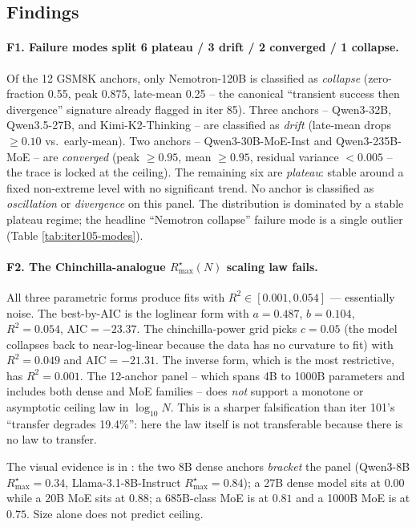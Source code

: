 \subsection*{Findings}

\paragraph{F1. Failure modes split 6 plateau / 3 drift / 2 converged / 1 collapse.}
Of the 12 GSM8K anchors, only Nemotron-120B is classified as
\emph{collapse} (zero-fraction 0.55, peak 0.875, late-mean 0.25 -- the
canonical ``transient success then divergence'' signature already
flagged in iter 85).  Three anchors -- Qwen3-32B, Qwen3.5-27B, and
Kimi-K2-Thinking -- are classified as \emph{drift} (late-mean drops
$\geq 0.10$ vs.\ early-mean).  Two anchors -- Qwen3-30B-MoE-Inst and
Qwen3-235B-MoE -- are \emph{converged} (peak $\geq 0.95$, mean
$\geq 0.95$, residual variance $< 0.005$ -- the trace is locked at the
ceiling).  The remaining six are \emph{plateau}: stable around a fixed
non-extreme level with no significant trend.  No anchor is classified
as \emph{oscillation} or \emph{divergence} on this panel.  The
distribution is dominated by a stable plateau regime; the headline
``Nemotron collapse'' failure mode is a single outlier (Table
\ref{tab:iter105-modes}).

\paragraph{F2. The Chinchilla-analogue $R_\mathrm{max}^\star(N)$ scaling law fails.}
All three parametric forms produce fits with $R^2 \in [0.001, 0.054]$
--- essentially noise.  The best-by-AIC is the loglinear form with
$a = 0.487$, $b = 0.104$, $R^2 = 0.054$, $\mathrm{AIC} = -23.37$.  The
chinchilla-power grid picks $c = 0.05$ (the model collapses back to
near-log-linear because the data has no curvature to fit) with
$R^2 = 0.049$ and $\mathrm{AIC} = -21.31$.  The inverse form, which is
the most restrictive, has $R^2 = 0.001$.  The 12-anchor panel --
which spans 4B to 1000B parameters and includes both dense and MoE
families -- does \emph{not} support a monotone or asymptotic ceiling
law in $\log_{10} N$.  This is a sharper falsification than iter 101's
``transfer degrades 19.4\%'': here the law itself is not transferable
because there is no law to transfer.

The visual evidence is in
: the
two 8B dense anchors \emph{bracket} the panel (Qwen3-8B
$R_\mathrm{max}^\star = 0.34$, Llama-3.1-8B-Instruct
$R_\mathrm{max}^\star = 0.84$); a 27B dense model sits at $0.00$
while a 20B MoE sits at $0.88$; a 685B-class MoE is at $0.81$ and a 1000B
MoE is at $0.75$.  Size alone does not predict ceiling.


